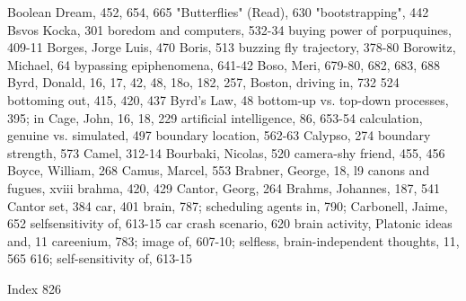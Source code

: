 Boolean Dream, 452, 654, 665                    "Butterflies" (Read), 630
"bootstrapping", 442                            Bsvos Kocka, 301
boredom and computers, 532-34                   buying power of porpuquines, 409-11
Borges, Jorge Luis, 470 Boris, 513              buzzing fly trajectory, 378-80
Borowitz, Michael, 64                           bypassing epiphenomena, 641-42
Boso, Meri, 679-80, 682, 683, 688               Byrd, Donald, 16, 17, 42, 48, 18o, 182, 257,
Boston, driving in, 732                           524
bottoming out, 415, 420, 437                    Byrd's Law, 48
bottom-up vs. top-down processes, 395; in       Cage, John, 16, 18, 229
 artificial intelligence, 86, 653-54            calculation, genuine vs. simulated, 497
boundary location, 562-63                       Calypso, 274
boundary strength, 573                          Camel, 312-14
Bourbaki, Nicolas, 520                          camera-shy friend, 455, 456
Boyce, William, 268                             Camus, Marcel, 553
Brabner, George, 18, l9                         canons and fugues, xviii
brahma, 420, 429                                Cantor, Georg, 264
Brahms, Johannes, 187, 541                      Cantor set, 384 car, 401
brain, 787; scheduling agents in, 790;          Carbonell, Jaime, 652
 selfsensitivity of, 613-15                     car crash scenario, 620
brain activity, Platonic ideas and, 11          careenium, 783; image of, 607-10; selfless,
brain-independent thoughts, 11, 565               616; self-sensitivity of, 613-15

 Index                                                                                      826

